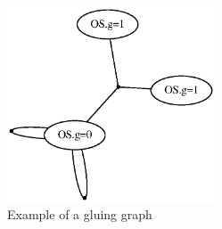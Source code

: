 \begin{figure}
    \centering
    \includegraphics[width=0.55\textwidth]{figs/gluinggraph}
    \caption{Example of a gluing graph}
    \label{ch4:fig:gluinggraph}
\end{figure}

